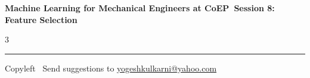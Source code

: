 \documentclass[8pt,landscape]{article}
\begin{document}
\footnotesize

\begin{center}
\Large{\textbf{Machine Learning for Mechanical Engineers at CoEP\ Session 8: Feature Selection}}
\end{center}

\begin{multicols}{3}

\end{multicols}

\rule{\linewidth}{0.25pt}
\scriptsize
Copyleft \textcopyleft\  Send suggestions to
\href{http://www.yogeshkulkarni.com}{yogeshkulkarni@yahoo.com}
\end{document}
